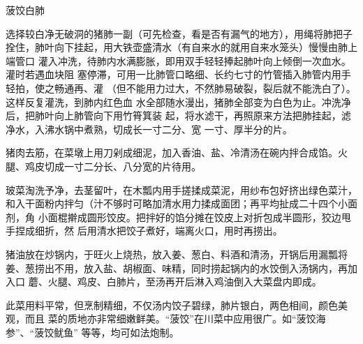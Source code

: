 \begin{recipe}[菠饺银肺]{菠饺白肺}

\ingredients


\preparation

\step 选择较白净无破洞的猪肺一副（可先检查，看是否有漏气的地方），用绳将肺把子
拴住，肺叶向下挂起，用大铁壶盛清水（有自来水的就用自来水笼头）慢慢由肺上端管口
灌入冲洗，待肺内水满膨胀，即用双手轻轻捧起肺叶向上倾倒一次血水。灌时若遇血块阻
塞停滞，可用一比肺管口略细、长约七寸的竹管插入肺管内用手轻拍，使之畅通再、灌
（但不能用力过大，不然肺易破裂，裂后就不能洗白了）。这样反复灌洗，到肺内红色血
水全部随水漫出，猪肺全部变为白色为止。冲洗净后，把肺叶向上肺管向下用竹筲箕装
起，将水滤干，再照原来方法把肺挂起，滤净水，入沸水锅中煮熟，切成长一寸二分、宽
一寸、厚半分的片。

\step 猪肉去筋，在菜墩上用刀剁成细泥，加入香油、盐、冷清汤在碗内拌合成馅。火
腿、鸡皮切成一寸二分长、八分宽的片待用。

\step 玻菜淘洗予净，去茎留叶，在木瓢内用手搓揉成菜泥，用纱布包好挤出绿色菜汁，
和入干面粉内拌匀（汁不够时可略加清水用力揉成面团；再平均扯成二十四个小面剂，角
小面棍擀成圆形饺皮。把拌好的馅分摊在饺皮上对折包成半圆形，狡边甩手捏成细折，然
后用清水把饺子煮好，端离火口，用时再捞出。

\step 猪油放在炒锅内，于旺火上烧热，放入姜、葱白、料酒和清汤，开锅后用漏瓢将
姜、葱捞出不用，放入盐、胡椒面、味精，同时捞起锅内的水饺倒入汤锅内，再加入口
蘑、火腿、鸡皮、白肺片，至汤再开后淋入鸡油倒入大菜盘内即成。

\features

此菜用料平常，但烹制精细，不仅汤内饺子碧绿，肺片银白，两色相间，颜色美观，而且
菜的质地亦非常细嫩鲜美。“菠饺”在川菜中应用很广。如“菠饺海参”、“菠饺鱿鱼”
等等，均可如法炮制。

\end{recipe}

